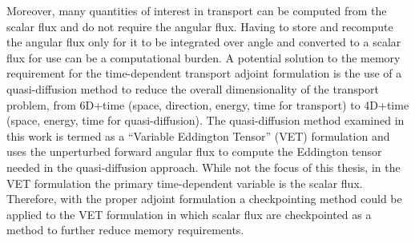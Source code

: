 \documentclass[12pt]{report}
\begin{document}

Moreover, many quantities of interest in transport can be computed from the scalar flux and do not require the angular flux. Having to store and recompute the angular flux only for it to be integrated over angle and converted to a scalar flux for use can be a computational burden. A potential solution to the memory requirement for the time-dependent transport adjoint formulation is the use of a quasi-diffusion method to reduce the overall dimensionality of the transport problem, from 6D+time (space, direction, energy, time for transport) to 4D+time (space, energy, time for quasi-diffusion). The quasi-diffusion method examined in this work is termed  as a ``Variable Eddington Tensor'' (VET) formulation and uses the unperturbed forward angular flux to compute the Eddington tensor needed in the quasi-diffusion approach. While not the focus of this thesis, in the VET formulation the primary time-dependent variable is the scalar flux. Therefore, with the proper adjoint formulation a checkpointing method could be applied to the VET formulation in which scalar flux are checkpointed as a method to further reduce memory requirements.
\end{document}
